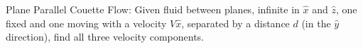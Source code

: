 
    Plane Parallel Couette Flow:  Given fluid between planes, infinite in
    $\hat{x}$ and $\hat{z}$, 
    one fixed and one moving with a velocity $V \hat{x}$, separated by a
    distance $d$ (in the $\hat{y}$ direction),
    find all three velocity components.

